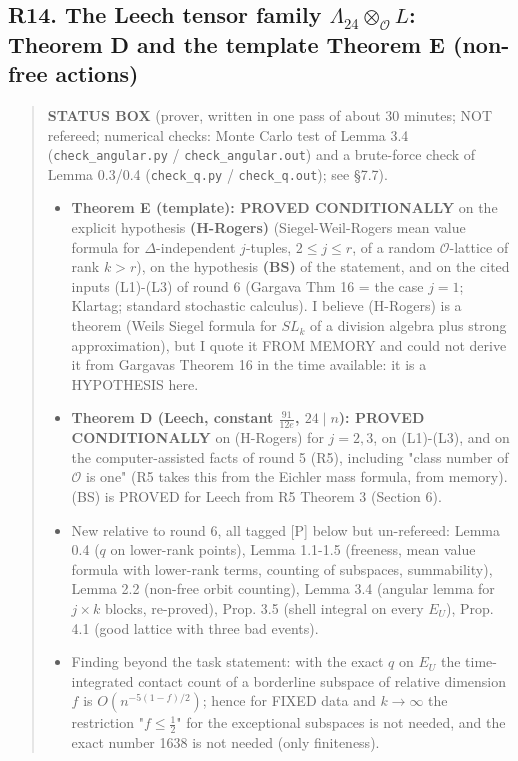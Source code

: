 \hypertarget{r14.-the-leech-tensor-family-lambda_24otimes_mathcal-ol-theorem-d-and-the-template-theorem-e-non-free-actions}{%
\subsection*{\texorpdfstring{R14. The Leech tensor family \(\Lambda_{24}\otimes_{\mathcal O}L\): Theorem D and the template Theorem E (non-free actions)}{R14. The Leech tensor family \textbackslash Lambda\_\{24\}\textbackslash otimes\_\{\textbackslash mathcal O\}L: Theorem D and the template Theorem E (non-free actions)}}\label{r14.-the-leech-tensor-family-lambda_24otimes_mathcal-ol-theorem-d-and-the-template-theorem-e-non-free-actions}}

\begin{quote}
\textbf{STATUS BOX} (prover, written in one pass of about 30 minutes; NOT refereed; numerical checks: Monte Carlo test of Lemma 3.4 (\texttt{check\_angular.py} / \texttt{check\_angular.out}) and a brute-force check of Lemma 0.3/0.4 (\texttt{check\_q.py} / \texttt{check\_q.out}); see §7.7).

\begin{itemize}
\tightlist
\item
  \textbf{Theorem E (template): PROVED CONDITIONALLY} on the explicit hypothesis \textbf{(H-Rogers)} (Siegel-Weil-Rogers mean value formula for \(\Delta\)-independent \(j\)-tuples, \(2\le j\le r\), of a random \(\mathcal O\)-lattice of rank \(k>r\)), on the hypothesis \textbf{(BS)} of the statement, and on the cited inputs (L1)-(L3) of round 6 (Gargava Thm 16 = the case \(j=1\); Klartag; standard stochastic calculus). I believe (H-Rogers) is a theorem (Weil\textquotesingle s Siegel formula for \(SL_k\) of a division algebra plus strong approximation), but I quote it FROM MEMORY and could not derive it from Gargava\textquotesingle s Theorem 16 in the time available: it is a HYPOTHESIS here.
\item
  \textbf{Theorem D (Leech, constant \(\frac{91}{12e}\), \(24\mid n\)): PROVED CONDITIONALLY} on (H-Rogers) for \(j=2,3\), on (L1)-(L3), and on the computer-assisted facts of round 5 (R5), including "class number of \(\mathcal O\) is one" (R5 takes this from the Eichler mass formula, from memory). (BS) is PROVED for Leech from R5 Theorem 3 (Section 6).
\item
  New relative to round 6, all tagged {[}P{]} below but un-refereed: Lemma 0.4 (\(q\) on lower-rank points), Lemma 1.1-1.5 (freeness, mean value formula with lower-rank terms, counting of subspaces, summability), Lemma 2.2 (non-free orbit counting), Lemma 3.4 (angular lemma for \(j\times k\) blocks, re-proved), Prop. 3.5 (shell integral on every \(E_U\)), Prop. 4.1 (good lattice with three bad events).
\item
  Finding beyond the task statement: with the exact \(q\) on \(E_U\) the time-integrated contact count of a borderline subspace of relative dimension \(f\) is \(O(n^{-5(1-f)/2})\); hence for FIXED data and \(k\to\infty\) the restriction "\(f\le\frac12\)" for the exceptional subspaces is not needed, and the exact number 1638 is not needed (only finiteness).
\end{itemize}
\end{quote}

